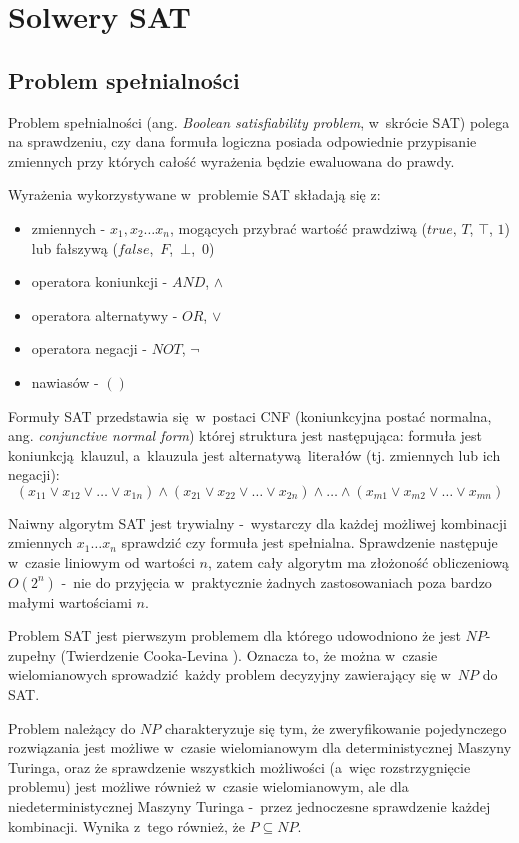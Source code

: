 \chapter{Solwery SAT}
\label{chp:sat-theory}
\section{Problem spełnialności}
Problem spełnialności (ang. \textit{Boolean satisfiability problem}, w~skrócie SAT) polega na sprawdzeniu, czy dana formuła logiczna
posiada odpowiednie przypisanie zmiennych przy których całość wyrażenia będzie ewaluowana do prawdy.

Wyrażenia wykorzystywane w~problemie SAT składają się z: 
\begin{itemize}
    \item zmiennych - $x_1, x_2 \dots x_n$, mogących przybrać wartość prawdziwą ($true$, $T$, $\top$, $1$) 
    lub fałszywą ($false$,~$F$,~$\bot$,~$0$)
    \item operatora koniunkcji - $AND$, $\land$
    \item operatora alternatywy - $OR$, $\lor$
    \item operatora negacji - $NOT$, $\lnot$
    \item nawiasów - $()$
\end{itemize}

Formuły SAT przedstawia się w~postaci CNF (koniunkcyjna postać normalna, ang. \textit{conjunctive normal form}) 
której struktura jest następująca: formuła jest koniunkcją klauzul, a~klauzula jest alternatywą literałów (tj. zmiennych lub ich negacji):
\[ (x_{11} \lor x_{12} \lor \dots \lor x_{1n} ) \land (x_{21} \lor x_{22} \lor \dots \lor x_{2n} ) \land  \dots \land (x_{m1} \lor x_{m2} \lor \dots \lor x_{mn} ) \]

Naiwny algorytm SAT jest trywialny -~wystarczy dla każdej możliwej kombinacji zmiennych $x_1 \dots x_n$
sprawdzić czy formuła jest spełnialna. Sprawdzenie następuje w~czasie liniowym od wartości $n$, zatem cały algorytm
ma złożoność obliczeniową $O(2^n)$ -~nie do przyjęcia w~praktycznie żadnych zastosowaniach poza bardzo małymi wartościami $n$.

Problem SAT jest pierwszym problemem dla którego udowodniono że jest $NP$-zupełny (Twierdzenie Cooka-Levina \cite{cook-SAT, levin-SAT}).
Oznacza to, że można w~czasie wielomianowych sprowadzić każdy problem decyzyjny zawierający się w~$NP$ do SAT.

Problem należący do $NP$ charakteryzuje się tym, że zweryfikowanie pojedynczego rozwiązania jest możliwe w~czasie wielomianowym
dla deterministycznej Maszyny Turinga, oraz że sprawdzenie wszystkich możliwości (a~więc rozstrzygnięcie problemu) jest możliwe
również w~czasie wielomianowym, ale dla niedeterministycznej Maszyny Turinga -~przez jednoczesne sprawdzenie każdej kombinacji. 
Wynika z~tego również, że $P \subseteq NP$.

